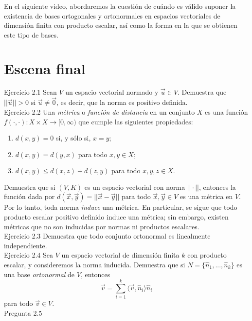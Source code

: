 \documentclass[12pt,dvipsnames]{article}
\numberwithin{equation}{section}
\begin{document}
En el siguiente video, abordaremos la cuestión de cuándo es válido suponer la existencia de bases ortogonales y ortonormales en espacios vectoriales de dimensión finita con producto escalar, así como la forma en la que se obtienen este tipo de bases.


\newpage
\section{Escena final}


Ejercicio 2.1 Sean $V$ un espacio vectorial normado y $\vec{u}\in V$. Demuestra que $||\vec{u}||>0$ si $\vec{u}\neq \vec{0}$, es decir, que la norma es positivo definida. \\

Ejercicio 2.2 Una \emph{métrica} o \emph{función de distancia} en un conjunto $X$ es una función $f(\cdot, \cdot ):X\times X\to [0,\infty)$ que cumple las siguientes propiedades:
\begin{enumerate}[label=(\roman*)]
    \item $d(x,y)=0$ si, y sólo si, $x=y$;

    \item $d(x,y)=d(y,x)$ para todo $x,y\in X$;

    \item $d(x,y) \le d(x,z) + d(z,y)$ para todo $x,y,z\in X$.
\end{enumerate}

\noindent Demuestra que si $(V,K)$ es un espacio vectorial con norma $||\cdot||$, entonces la función dada por $d(\vec{x},\vec{y})=||\vec{x}-\vec{y}||$ para todo $\vec{x},\vec{y}\in V$ es una métrica en $V$. Por lo tanto, toda norma \emph{induce} una métrica. En particular, se sigue que todo producto escalar positivo definido induce una métrica; sin embargo, existen métricas que no son inducidas por normas ni productos escalares. \\

Ejercicio 2.3 Demuestra que todo conjunto ortonormal es linealmente independiente. \\

Ejercicio 2.4 Sea $V$ un espacio vectorial de dimensión finita $k$ con producto escalar, y consideremos la norma inducida. Demuestra que si $N=\{\hat{n}_1,...,\hat{n}_k\}$ es una base \emph{ortonormal} de $V$, entonces
\[
    \vec{v} = \sum_{i=1}^k \langle \vec{v} , \hat{n}_i \rangle \hat{n}_i
\]
para todo $\vec{v}\in V$. \\

Pregunta 2.5
\end{document}
